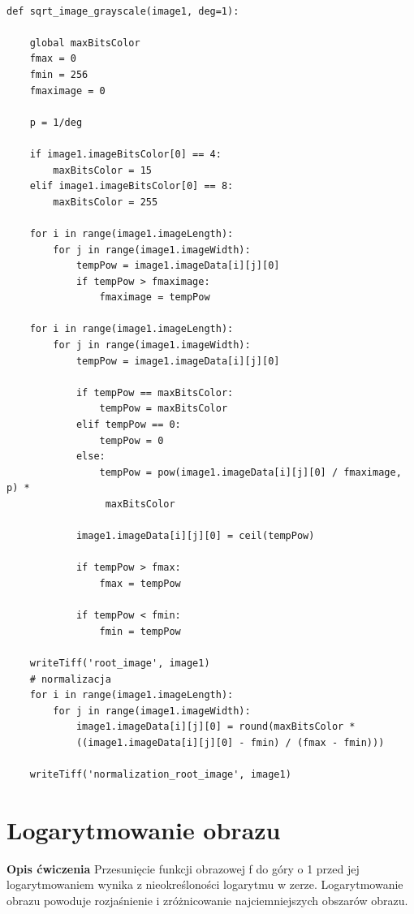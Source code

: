 \documentclass[magisterska,openany]{pracadypl}
\begin{document}
\lstset{language=Python}
\vspace{0.25cm}
\begin{lstlisting}[caption={Pierwiastkowanie obrazu}]

def sqrt_image_grayscale(image1, deg=1):

    global maxBitsColor
    fmax = 0
    fmin = 256
    fmaximage = 0

    p = 1/deg

    if image1.imageBitsColor[0] == 4:
        maxBitsColor = 15
    elif image1.imageBitsColor[0] == 8:
        maxBitsColor = 255

    for i in range(image1.imageLength):
        for j in range(image1.imageWidth):
            tempPow = image1.imageData[i][j][0]
            if tempPow > fmaximage:
                fmaximage = tempPow

    for i in range(image1.imageLength):
        for j in range(image1.imageWidth):
            tempPow = image1.imageData[i][j][0]

            if tempPow == maxBitsColor:
                tempPow = maxBitsColor
            elif tempPow == 0:
                tempPow = 0
            else:
                tempPow = pow(image1.imageData[i][j][0] / fmaximage, p) *
                 maxBitsColor

            image1.imageData[i][j][0] = ceil(tempPow)

            if tempPow > fmax:
                fmax = tempPow

            if tempPow < fmin:
                fmin = tempPow

    writeTiff('root_image', image1)
    # normalizacja
    for i in range(image1.imageLength):
        for j in range(image1.imageWidth):
            image1.imageData[i][j][0] = round(maxBitsColor * 
            ((image1.imageData[i][j][0] - fmin) / (fmax - fmin)))

    writeTiff('normalization_root_image', image1)

\end{lstlisting}
\newpage


\section{Logarytmowanie obrazu}

\vspace{0.5cm}\textbf{\Large Opis ćwiczenia}
\vspace{0.25cm}\newline
Przesunięcie funkcji obrazowej f do góry o 1 przed jej logarytmowaniem wynika z
nieokreśloności logarytmu w zerze. Logarytmowanie obrazu powoduje rozjaśnienie i zróżnicowanie najciemniejszych obszarów obrazu.
\newline
\newline
\end{document}
